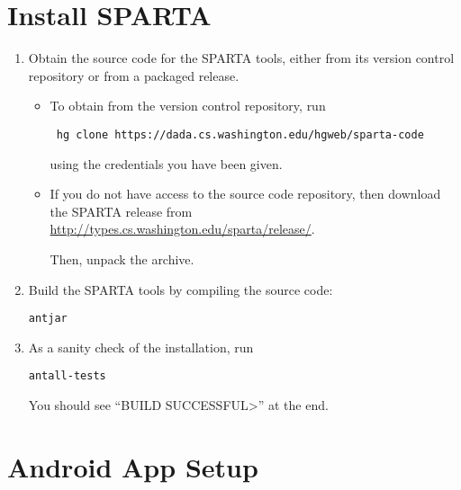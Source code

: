 



\section{Install SPARTA\label{sec:install}}

\begin{enumerate}

\item
  Obtain the source code for the SPARTA tools, either from its version
  control repository or from a packaged release.

\begin{itemize}
\item
  To obtain from the version control repository, run
\begin{Verbatim}
 hg clone https://dada.cs.washington.edu/hgweb/sparta-code
\end{Verbatim}
  using the credentials you have been given.
\item 
  If you do not have access to the source code repository, then
  download the SPARTA release from
  \url{http://types.cs.washington.edu/sparta/release/}.  

  Then, unpack the archive.
\end{itemize}

%


\item Build the SPARTA tools by compiling the source code:
\begin{alltt}
ant jar
\end{alltt}

\item
As a sanity check of the installation, run

\begin{alltt}
ant all-tests
\end{alltt}

You should see ``\<BUILD SUCCESSFUL>'' at the end.


\end{enumerate}


\section{Android App Setup\label{sec:antsetup}}

